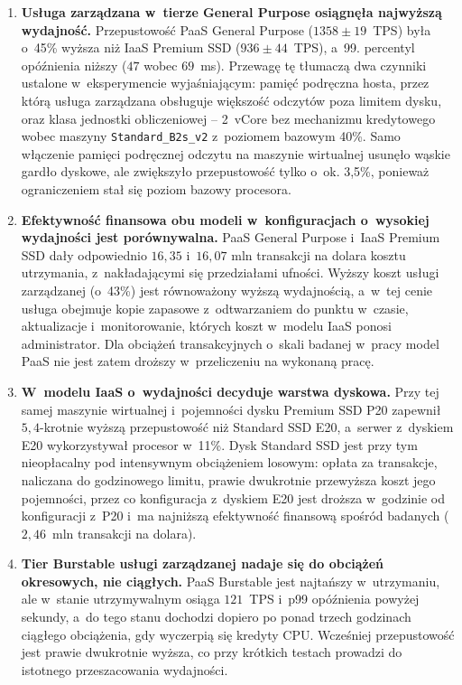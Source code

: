 \begin{enumerate}
  \item \textbf{Usługa zarządzana w~tierze General Purpose osiągnęła najwyższą wydajność.}
  Przepustowość PaaS General Purpose ($1358 \pm 19$~TPS) była o~45\% wyższa niż IaaS Premium
  SSD ($936 \pm 44$~TPS), a~99. percentyl opóźnienia niższy ($47$ wobec $69$~ms). Przewagę
  tę tłumaczą dwa czynniki ustalone w~eksperymencie wyjaśniającym: pamięć podręczna hosta,
  przez którą usługa zarządzana obsługuje większość odczytów poza limitem dysku, oraz klasa
  jednostki obliczeniowej -- 2~vCore bez mechanizmu kredytowego wobec maszyny
  \texttt{Standard\_B2s\_v2} z~poziomem bazowym 40\%. Samo włączenie pamięci podręcznej
  odczytu na maszynie wirtualnej usunęło wąskie gardło dyskowe, ale zwiększyło przepustowość
  tylko o~ok. 3,5\%, ponieważ ograniczeniem stał się poziom bazowy procesora.

  \item \textbf{Efektywność finansowa obu modeli w~konfiguracjach o~wysokiej wydajności jest
  porównywalna.} PaaS General Purpose i~IaaS Premium SSD dały odpowiednio $16{,}35$ i~$16{,}07$
  mln transakcji na dolara kosztu utrzymania, z~nakładającymi się przedziałami ufności.
  Wyższy koszt usługi zarządzanej (o~43\%) jest równoważony wyższą wydajnością, a~w~tej cenie
  usługa obejmuje kopie zapasowe z~odtwarzaniem do punktu w~czasie, aktualizacje
  i~monitorowanie, których koszt w~modelu IaaS ponosi administrator. Dla obciążeń
  transakcyjnych o~skali badanej w~pracy model PaaS nie jest zatem droższy w~przeliczeniu na
  wykonaną pracę.

  \item \textbf{W~modelu IaaS o~wydajności decyduje warstwa dyskowa.} Przy tej samej maszynie
  wirtualnej i~pojemności dysku Premium SSD P20 zapewnił $5{,}4$-krotnie wyższą przepustowość
  niż Standard SSD E20, a~serwer z~dyskiem E20 wykorzystywał procesor w~11\%. Dysk Standard SSD
  jest przy tym nieopłacalny pod intensywnym obciążeniem losowym: opłata za transakcje,
  naliczana do godzinowego limitu, prawie dwukrotnie przewyższa koszt jego pojemności, przez
  co konfiguracja z~dyskiem E20 jest droższa w~godzinie od konfiguracji z~P20 i~ma najniższą
  efektywność finansową spośród badanych ($2{,}46$~mln transakcji na dolara).

  \item \textbf{Tier Burstable usługi zarządzanej nadaje się do obciążeń okresowych, nie
  ciągłych.} PaaS Burstable jest najtańszy w~utrzymaniu, ale w~stanie utrzymywalnym osiąga
  $121$~TPS i~p99 opóźnienia powyżej sekundy, a~do tego stanu dochodzi dopiero po ponad
  trzech godzinach ciągłego obciążenia, gdy wyczerpią się kredyty CPU. Wcześniej przepustowość
  jest prawie dwukrotnie wyższa, co przy krótkich testach prowadzi do istotnego przeszacowania
  wydajności.


\end{enumerate}
